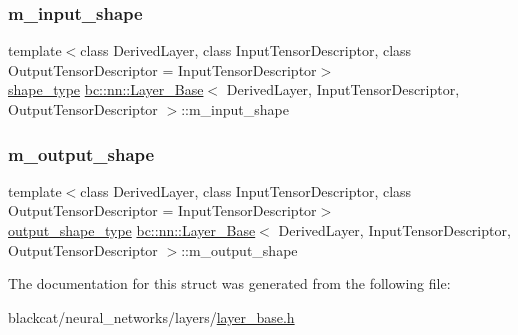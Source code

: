 \mbox{\label{structbc_1_1nn_1_1Layer__Base_a177f9c08a4c38718cbfca7aac0df6d3f}} 
\subsubsection{\texorpdfstring{m\+\_\+input\+\_\+shape}{m\_input\_shape}}
{\footnotesize\ttfamily template$<$class Derived\+Layer, class Input\+Tensor\+Descriptor, class Output\+Tensor\+Descriptor = Input\+Tensor\+Descriptor$>$ \\
\hyperlink{structbc_1_1nn_1_1Layer__Base_ab8cbdaad20a0270b2555a91676a79932}{shape\+\_\+type} \hyperlink{structbc_1_1nn_1_1Layer__Base}{bc\+::nn\+::\+Layer\+\_\+\+Base}$<$ Derived\+Layer, Input\+Tensor\+Descriptor, Output\+Tensor\+Descriptor $>$\+::m\+\_\+input\+\_\+shape\hspace{0.3cm}{\ttfamily [protected]}}

\mbox{\label{structbc_1_1nn_1_1Layer__Base_a01fc8358f70fd47ac93f87b437156da0}} 
\subsubsection{\texorpdfstring{m\+\_\+output\+\_\+shape}{m\_output\_shape}}
{\footnotesize\ttfamily template$<$class Derived\+Layer, class Input\+Tensor\+Descriptor, class Output\+Tensor\+Descriptor = Input\+Tensor\+Descriptor$>$ \\
\hyperlink{structbc_1_1nn_1_1Layer__Output__Base_aa627047014ee5dff2b9cc1804c791815}{output\+\_\+shape\+\_\+type} \hyperlink{structbc_1_1nn_1_1Layer__Base}{bc\+::nn\+::\+Layer\+\_\+\+Base}$<$ Derived\+Layer, Input\+Tensor\+Descriptor, Output\+Tensor\+Descriptor $>$\+::m\+\_\+output\+\_\+shape\hspace{0.3cm}{\ttfamily [protected]}}



The documentation for this struct was generated from the following file\+:\begin{DoxyCompactItemize}
\item 
blackcat/neural\+\_\+networks/layers/\hyperlink{layer__base_8h}{layer\+\_\+base.\+h}\end{DoxyCompactItemize}
